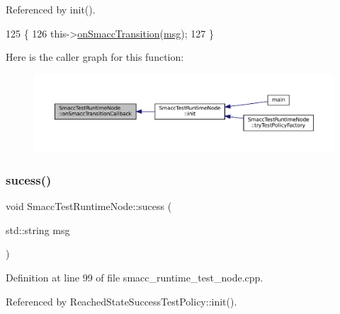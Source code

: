 Referenced by init().


\begin{DoxyCode}
125   \{
126       this->\hyperlink{classSmaccTestRuntimeNode_aaaedcb5c8a4cca432b5138bb1dfb0a6c}{onSmaccTransition}(\hyperlink{namespacebattery__monitor__node_ab1920c64448816edd4064e494275fdff}{msg});
127   \}
\end{DoxyCode}
Here is the caller graph for this function\+:
\nopagebreak
\begin{figure}[H]
\begin{center}
\leavevmode
\includegraphics[width=350pt]{classSmaccTestRuntimeNode_a09b21826547d6ac7de6049611bb1cde8_icgraph}
\end{center}
\end{figure}
\mbox{\label{classSmaccTestRuntimeNode_ae77d02680e11f7e128841b0ab9ed6e13}} 
\subsubsection{\texorpdfstring{sucess()}{sucess()}}
{\footnotesize\ttfamily void Smacc\+Test\+Runtime\+Node\+::sucess (\begin{DoxyParamCaption}\item[{std\+::string}]{msg }\end{DoxyParamCaption})\hspace{0.3cm}{\ttfamily [inline]}}



Definition at line 99 of file smacc\+\_\+runtime\+\_\+test\+\_\+node.\+cpp.



Referenced by Reached\+State\+Success\+Test\+Policy\+::init().


